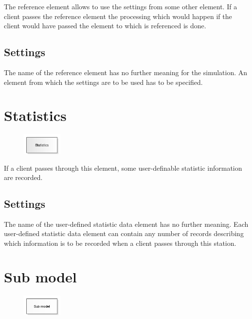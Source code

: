 The reference element allows to use the settings from some other element.
If a client passes the reference element the processing which would happen
if the client would have passed the element to which is referenced is done.

\subsection*{Settings}

The name of the reference element has no further meaning for the simulation.
An element from which the settings are to be used has to be specified.


\section{Statistics}
\label{ref:ModelElementUserStatistic}

\begin{figure}
\vspace{-22pt}
\includegraphics[width=2cm]{imageModelElementUserStatistic.png}
\vspace{-22pt}
\end{figure}

If a client passes through this element, some user-definable statistic information are recorded.

\subsection*{Settings}

The name of the user-defined statistic data element has no further meaning.
Each user-defined statistic data element can contain any number of records
describing which information is to be recorded when a client passes through
this station.


\section{Sub model}
\label{ref:ModelElementSub}

\begin{figure}
\vspace{-22pt}
\includegraphics[width=2cm]{imageModelElementSub.png}
\vspace{-22pt}
\end{figure}

